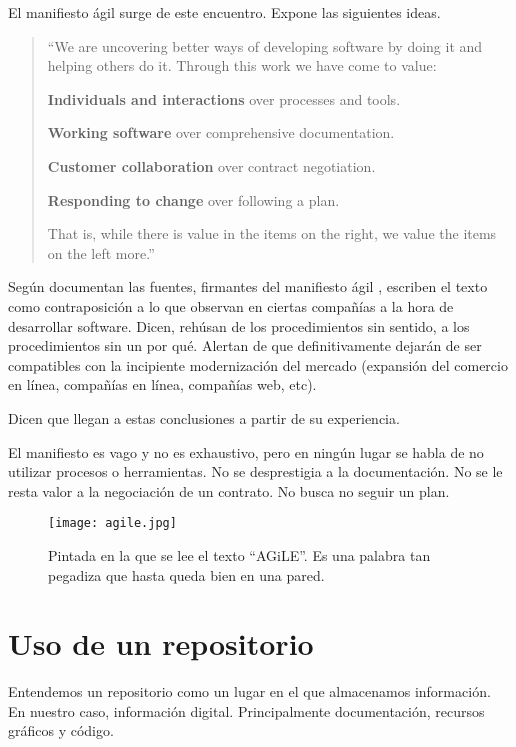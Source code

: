 El manifiesto ágil \cite{ManifiestoAgil} surge de este encuentro. Expone las siguientes ideas.

\begin{quote}
    \itshape{
    ``We are uncovering better ways of developing
    software by doing it and helping others do it.
    Through this work we have come to value:
    
    \textbf{Individuals and interactions} over processes and tools.

    \textbf{Working software} over comprehensive documentation.

    \textbf{Customer collaboration} over contract negotiation.

    \textbf{Responding to change} over following a plan.
    
    That is, while there is value in the items on
    the right, we value the items on the left more.''
    }
\end{quote}

Según documentan las fuentes, firmantes del manifiesto ágil \cite{ManifiestoAgil}, 
escriben el texto como contraposición a lo que observan en ciertas compañías a la
hora de desarrollar software. Dicen, rehúsan de los procedimientos sin sentido,
a los procedimientos sin un por qué. Alertan de que definitivamente dejarán de ser
compatibles con la incipiente modernización del mercado (expansión del comercio en
línea, compañías en línea, compañías web, etc). \cite{HistoriaManifiestoAgilJim}

Dicen que llegan a estas conclusiones a partir de su experiencia. \cite{HistoriaManifiestoAgilJim}

El manifiesto es vago y no es exhaustivo, pero en ningún lugar se habla de no utilizar
procesos o herramientas.
No se desprestigia a la documentación. No se le resta valor a la negociación
de un contrato. No busca no seguir un plan.

\begin{figure}[h]
    \centering
    \texttt{[image: agile.jpg]}
    \caption{Pintada en la que se lee el texto ``AGiLE''. Es una palabra tan pegadiza
    que hasta queda bien en una pared.}
\end{figure}

\section{Uso de un repositorio}

Entendemos un repositorio como un lugar en el que almacenamos información.
En nuestro caso, información digital. Principalmente documentación, recursos
gráficos y código.

